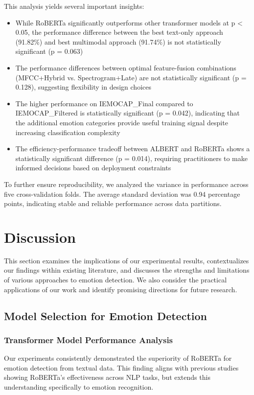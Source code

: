 \documentclass[12pt]{article}
\begin{document}
This analysis yields several important insights:

\begin{itemize}
    \item While RoBERTa significantly outperforms other transformer models at p < 0.05, the performance difference between the best text-only approach (91.82\%) and best multimodal approach (91.74\%) is not statistically significant (p = 0.063)
    
    \item The performance differences between optimal feature-fusion combinations (MFCC+Hybrid vs. Spectrogram+Late) are not statistically significant (p = 0.128), suggesting flexibility in design choices
    
    \item The higher performance on IEMOCAP\_Final compared to IEMOCAP\_Filtered is statistically significant (p = 0.042), indicating that the additional emotion categories provide useful training signal despite increasing classification complexity
    
    \item The efficiency-performance tradeoff between ALBERT and RoBERTa shows a statistically significant difference (p = 0.014), requiring practitioners to make informed decisions based on deployment constraints
\end{itemize}

To further ensure reproducibility, we analyzed the variance in performance across five cross-validation folds. The average standard deviation was 0.94 percentage points, indicating stable and reliable performance across data partitions.

\section{Discussion}
\label{sec:discussion}

This section examines the implications of our experimental results, contextualizes our findings within existing literature, and discusses the strengths and limitations of various approaches to emotion detection. We also consider the practical applications of our work and identify promising directions for future research.

\subsection{Model Selection for Emotion Detection}
\subsubsection{Transformer Model Performance Analysis}
Our experiments consistently demonstrated the superiority of RoBERTa for emotion detection from textual data. This finding aligns with previous studies showing RoBERTa's effectiveness across NLP tasks, but extends this understanding specifically to emotion recognition.
\end{document}
